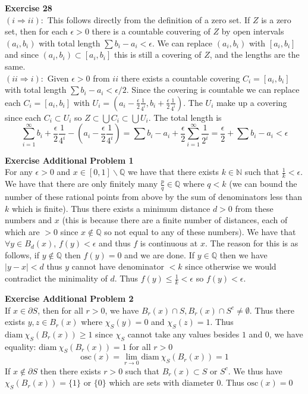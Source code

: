 \documentclass[12pt]{article}
\newenvironment{ques}[1]{\textbf{Exercise #1}\vspace{1 mm}\\ }{\bigskip}
\theoremstyle{definition}
\newcommand{\Q}{\mathbb Q}
\newcommand{\N}{\mathbb N}
\newcommand{\osc}{\text{osc}}
\newcommand{\diam}{\text{diam} \ }
\begin{document}
\begin{ques}{28}
	$(i \Rightarrow ii):$ This follows directly from the definition of a zero
	set. If $Z$ is a zero set, then for each $\epsilon > 0$ there is a
	countable couvering of $Z$ by open intervals  $(a_i,b_i)$ with total length
	$\sum b_i - a_i < \epsilon$. We can replace $(a_i, b_i)$ with $[a_i,b_i]$
	and since $(a_i,b_i) \subset [a_i,b_i]$ this is still a covering of $Z$,
	and the lengths are the same.\\
	$(ii \Rightarrow i):$ Given $\epsilon > 0$ from $ii$ there exists a countable
	covering $C_i = [a_i,b_i]$ with total length $\sum b_i - a_i < \epsilon / 2$.
	Since the covering is countable we can replace each $C_i = [a_i,b_i]$ with
	$U_i = (a_i - \frac \epsilon 2\frac 1 {4^i}, b_i +\frac \epsilon 2 \frac 1 {4^i})$. The $U_i$ make up a
	covering since each $C_i \subset U_i$ so $Z \subset \bigcup C_i \subset
	\bigcup U_i$. The total length is 
	$$\sum_{i=1}^\infty b_i +\frac \epsilon 2 \frac 1 {4^i} - (a_i -\frac
	\epsilon 2 \frac 1 {4^i}) = \sum b_i - a_i +\frac \epsilon 2
	\sum_{i=1}^\infty \frac 1 {2^i} = \frac \epsilon 2 + \sum b_i - a_i < \epsilon$$
\end{ques}

\begin{ques}{Additional Problem 1}
	For any $\epsilon > 0$ and $x \in [0,1] \backslash \Q$ we have that there
	exists $k \in \N$ such that $\frac 1 k < \epsilon$. We have that there are
	only finitely many $\frac p q \in \Q$ where $q < k$ (we can bound the
	number of these rational points from above by the sum of denominators less
	than $k$ which is finite). Thus there exists a minimum distance $d > 0$
	from these numbers and $x$ (this is because there are a finite number of
	distances, each of which are $ > 0 $ since $x \notin  \Q$ so not equal to
	any of these numbers). We have that $\forall y \in B_d(x)$, $f(y) <
	\epsilon$ and thus $f$ is continuous at $x$. The reason for this is as
	follows, if $y \notin \Q$ then $f(y) = 0$ and we are done. If $y \in \Q$
	then we have $|y - x| < d$ thus $y$ cannot have denominator $< k$ since
	otherwise we would contradict the minimality of $d$. Thus $f(y) \leq \frac
	1 k < \epsilon$ so $f(y) < \epsilon$.
\end{ques}

\begin{ques}{Additional Problem 2}
	If $x \in \partial S$, then for all $r > 0$, we have $B_r(x) \cap S, B_r(x)
	\cap S^c \neq \emptyset$. Thus there exists $y,z \in B_r(x)$ where
	$\chi_S(y) = 0$ and $\chi_S(z) = 1$. Thus $\diam \chi_S(B_r(x)) \geq 1$
	since $\chi_S$ cannot take any values besides $1$ and $0$, we have
	equality:  $\diam \chi_S(B_r(x)) = 1$ for all $r > 0$ 
	$$\osc(x) = \lim_{r \to 0} \diam \chi_S(B_r(x)) = 1$$
	If $x \notin \partial S$ then there exists $r > 0$ such that $B_r(x)
	\subset S$ or $S^c$. We thus have $\chi_S(B_r(x)) = \{1\}$ or $\{0\}$ which
	are sets with diameter $0$. Thus $\osc (x) = 0$
\end{ques}
\end{document}

